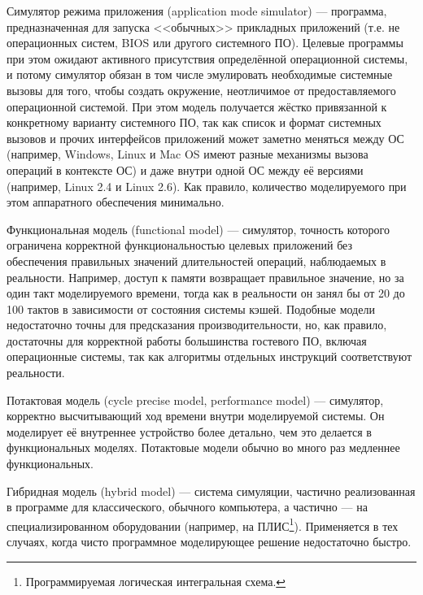 \begin{description*}
\item[Симулятор режима приложения] (\abbr application mode si\-mu\-la\-tor) --- программа, предназначенная для запуска <<обычных>> прикладных приложений (т.е. не операционных систем, BIOS или другого системного ПО). Целевые программы при этом ожидают активного присутствия определённой операционной системы, и потому симулятор обязан в том числе эмулировать необходимые  системные вызовы для того, чтобы создать окружение, неотличимое от предоставляемого операционной системой. При этом модель получается жёстко привязанной к конкретному варианту системного ПО, так как список и формат системных вызовов и прочих интерфейсов приложений может заметно меняться между ОС (например, Windows, Linux и Mac OS имеют разные механизмы вызова операций в контексте ОС) и даже внутри одной ОС между её версиями (например, Linux 2.4 и Linux 2.6). Как правило, количество моделируемого при этом аппаратного обеспечения минимально.

\item[Функциональная модель] (\abbr functional model) --- симулятор, точность которого ограничена корректной функциональностью целевых приложений без обеспечения правильных значений длительностей операций, наблюдаемых в реальности. Например, доступ к памяти возвращает правильное значение, но за один такт моделируемого времени, тогда как в реальности он занял бы от 20 до 100 тактов в зависимости от состояния системы кэшей. Подобные модели недостаточно точны для предсказания производительности, но, как правило, достаточны для корректной работы большинства гостевого ПО, включая операционные системы, так как алгоритмы отдельных инструкций соответствуют реальности.

\item[Потактовая модель] (\abbr cycle precise model, performance model)  --- симулятор, корректно высчитывающий ход времени внутри моделируемой системы. Он моделирует её внутреннее устройство более детально, чем это делается в функциональных моделях. Потактовые модели обычно во много раз медленнее функциональных.

\item[Гибридная модель] (\abbr hybrid model) --- система симуляции, частично реализованная в программе для классического, обычного компьютера, а частично --- на специализированном оборудовании (например, на ПЛИС\footnote{Программируемая логическая интегральная схема.}). Применяется в тех случаях, когда чисто программное моделирующее решение недостаточно быстро.

\end{description*}


